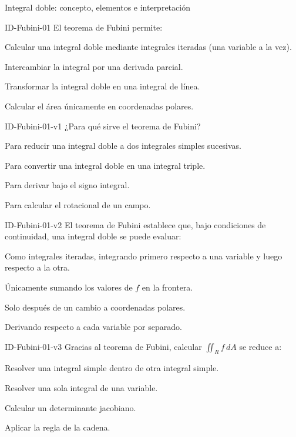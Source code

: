 \documentclass[a4,11pt]{aleph-notas}
\begin{document}
\begin{quiz}{Integral doble: concepto, elementos e interpretación}
\begin{multi}[]%
    {ID-Fubini-01}
    El teorema de Fubini permite:
    \item* Calcular una integral doble mediante integrales iteradas (una variable a la vez).
    \item Intercambiar la integral por una derivada parcial.
    \item Transformar la integral doble en una integral de línea.
    \item Calcular el área únicamente en coordenadas polares.
\end{multi}

\begin{multi}[]%
    {ID-Fubini-01-v1}
    ¿Para qué sirve el teorema de Fubini?
    \item* Para reducir una integral doble a dos integrales simples sucesivas.
    \item Para convertir una integral doble en una integral triple.
    \item Para derivar bajo el signo integral.
    \item Para calcular el rotacional de un campo.
\end{multi}

\begin{multi}[]%
    {ID-Fubini-01-v2}
    El teorema de Fubini establece que, bajo condiciones de continuidad, una integral doble se puede evaluar:
    \item* Como integrales iteradas, integrando primero respecto a una variable y luego respecto a la otra.
    \item Únicamente sumando los valores de $f$ en la frontera.
    \item Solo después de un cambio a coordenadas polares.
    \item Derivando respecto a cada variable por separado.
\end{multi}

\begin{multi}[]%
    {ID-Fubini-01-v3}
    Gracias al teorema de Fubini, calcular $\displaystyle\iint_R f\,dA$ se reduce a:
    \item* Resolver una integral simple dentro de otra integral simple.
    \item Resolver una sola integral de una variable.
    \item Calcular un determinante jacobiano.
    \item Aplicar la regla de la cadena.
\end{multi}


\end{quiz}
\end{document}
